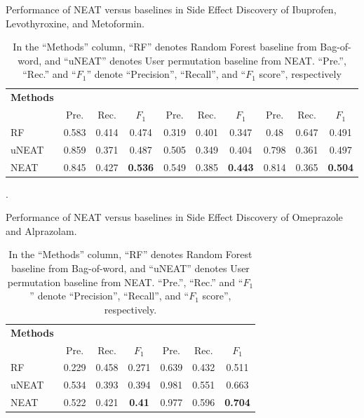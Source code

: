 \documentclass{bmcart}
\begin{document}
\begin{backmatter}
\begin{table}[h!]
  \label{table:credibility}
\end{table}
\begin{table}[h!]
  \caption{Performance of NEAT versus baselines in Side Effect Discovery of Ibuprofen, Levothyroxine, and Metoformin.}
  \scalebox{1.2}
  \footnotesize
  \begin{tabular}{l|c c c|c c c|c c c}
    \hline
    \textbf{Methods}& 
    \multicolumn{3}{c|}{\centering{Ibuprofen}} & \multicolumn{3}{c|}{\centering{Levothyroxine}} & \multicolumn{3}{c}{\centering{Metoformin}}\\
    & Pre. & Rec. & $F_1$ & Pre. & Rec. & $F_1$ & Pre. & Rec. & $F_1$ \\ \hline
    RF & 0.583 & 0.414 & 0.474 & 0.319 & 0.401 & 0.347 & 0.48 & 0.647 & 0.491 \\
    uNEAT & 0.859 & 0.371 & 0.487 & 0.505 & 0.349 & 0.404 & 0.798 & 0.361 & 0.497 \\
    NEAT & 0.845 & 0.427 & \textbf{0.536} & 0.549 & 0.385 & \textbf{0.443} & 0.814 & 0.365 & \textbf{0.504} \\ \hline
  \end{tabular}
  \caption*{In the ``Methods'' column, ``RF'' denotes Random Forest baseline from Bag-of-word, and ``uNEAT'' denotes User permutation baseline from NEAT. ``Pre.'', ``Rec.'' and ``$F_1$'' denote ``Precision'', ``Recall'', and ``$F_1$ score'', respectively}.
  \label{table:se_discovery1}
\end{table}
\begin{table}[h!]
  \caption{Performance of NEAT versus baselines in Side Effect Discovery of Omeprazole and Alprazolam.}
  \scalebox{1.2}
  \footnotesize
  \begin{tabular}{l|c c c|c c c}
    \hline
    \textbf{Methods} &
    \multicolumn{3}{c|}{\centering{Omeprazole}} &
    \multicolumn{3}{c}{\centering{Alprazolam}}\\
    & Pre. & Rec. & $F_1$ & Pre. & Rec. & $F_1$ \\ \hline
    RF & 0.229 & 0.458 & 0.271 & 0.639 & 0.432 & 0.511 \\
    uNEAT & 0.534 & 0.393 & 0.394 & 0.981 & 0.551 & 0.663 \\
    NEAT & 0.522 & 0.421 & \textbf{0.41} & 0.977 & 0.596 & \textbf{0.704} \\ \hline
  \end{tabular}
  \caption*{In the ``Methods'' column, ``RF'' denotes Random Forest baseline from Bag-of-word, and ``uNEAT'' denotes User permutation baseline from NEAT. ``Pre.'', ``Rec.'' and ``$F_1$'' denote ``Precision'', ``Recall'', and ``$F_1$ score'', respectively.}

\end{table}
\end{backmatter}
\end{document}

